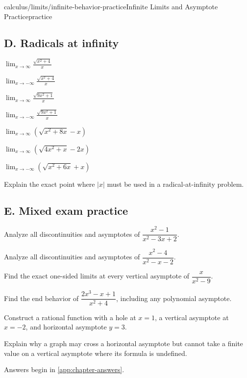 \begin{webpage}{calculus/limits/infinite-behavior-practice}{Infinite Limits and Asymptote Practice}{practice}
\subsection*{D. Radicals at infinity}
\begin{bgexercises}[label=\textbf{4.\arabic*},resume]
  \item \(\displaystyle\lim_{x\to\infty}\frac{\sqrt{x^2+4}}{x}\)
  \item \(\displaystyle\lim_{x\to-\infty}\frac{\sqrt{x^2+4}}{x}\)
  \item \(\displaystyle\lim_{x\to\infty}\frac{\sqrt{9x^2+1}}{x}\)
  \item \(\displaystyle\lim_{x\to-\infty}\frac{\sqrt{9x^2+1}}{x}\)
  \item \(\displaystyle\lim_{x\to\infty}\left(\sqrt{x^2+8x}-x\right)\)
  \item \(\displaystyle\lim_{x\to\infty}\left(\sqrt{4x^2+x}-2x\right)\)
  \item \(\displaystyle\lim_{x\to-\infty}\left(\sqrt{x^2+6x}+x\right)\)
  \item Explain the exact point where \(|x|\) must be used in a radical-at-infinity problem.
\end{bgexercises}

\subsection*{E. Mixed exam practice}
\begin{bgexercises}[label=\textbf{4.\arabic*},resume]
  \item Analyze all discontinuities and asymptotes of \(\dfrac{x^2-1}{x^2-3x+2}\).
  \item Analyze all discontinuities and asymptotes of \(\dfrac{x^2-4}{x^2-x-2}\).
  \item Find the exact one-sided limits at every vertical asymptote of \(\dfrac{x}{x^2-9}\).
  \item Find the end behavior of \(\dfrac{2x^3-x+1}{x^2+4}\), including any polynomial asymptote.
  \item Construct a rational function with a hole at \(x=1\), a vertical asymptote at \(x=-2\), and horizontal asymptote \(y=3\).
  \item Explain why a graph may cross a horizontal asymptote but cannot take a finite value on a vertical asymptote where its formula is undefined.
\end{bgexercises}

Answers begin in \cref{app:chapter-answers}.
\end{webpage}
